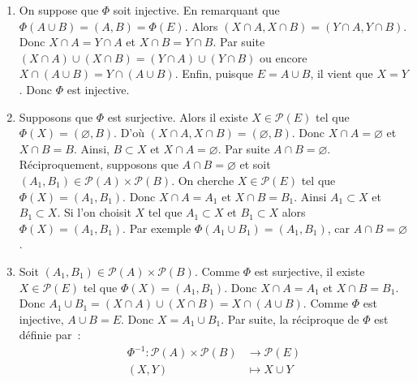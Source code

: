 	\begin{enumerate}
		\item On suppose que $\Phi$ soit injective. En remarquant que $\Phi(A \cup B) =(A,B)=\Phi(E)$. Alors $(X\cap A, X \cap B) = (Y \cap A, Y \cap B).$ Donc $X \cap A = Y \cap A$ et $X \cap B = Y \cap B$. Par suite $(X \cap A) \cup (X \cap B) = (Y \cap A) \cup (Y \cap B)$ ou encore $X\cap (A \cup B) = Y \cap(A \cup B)$. Enfin, puisque $E=A \cup B$, il  vient que $X=Y$. Donc $\Phi$ est injective.
		\item Supposons que $\Phi$ est surjective. Alors il existe $X \in \mathcal{P}(E)$ tel que $\Phi(X)=(\varnothing, B)$. D'où $(X \cap A, X \cap B)=(\varnothing, B)$. Donc $X \cap A = \varnothing$ et $X\cap B = B$. Ainsi, $B \subset X$ et $X \cap A = \varnothing$. Par suite $A\cap B = \varnothing$. Réciproquement, supposons que $A\cap B=\varnothing$ et soit $(A_1, B_1)\in \mathcal{P}(A)\times \mathcal{P}(B)$. On cherche $X\in \mathcal{P}(E)$ tel que $\Phi (X)=(A_1,B_1)$. Donc $X\cap A =A_1$ et $X\cap B = B_1$. Ainsi $A_1 \subset X$ et $B_1 \subset X$. Si l'on choisit $X$ tel que $A_1 \subset X$  et $B_1 \subset X$ alors $\Phi (X)=(A_1,B_1)$. Par exemple $\Phi (A_1\cup B_1)=(A_1,B_1)$, car $A\cap B=\varnothing$.
		\item Soit $(A_1, B_1)\in \mathcal{P}(A)\times \mathcal{P}(B)$. Comme $\Phi$ est surjective, il existe $X\in \mathcal{P}(E)$ tel que $\Phi (X)=(A_1,B_1)$. Donc $X\cap A =A_1$ et $X\cap B = B_1$. Donc $A_1 \cup B_1 =(X\cap A)\cup (X\cap B) = X\cap (A\cup B)$. Comme $\Phi$ est injective, $A\cup B=E$. Donc $X=A_1\cup B_1$. Par suite, la réciproque de $\Phi$ est définie par :
		\begin{align*}
			\Phi^{-1}: \mathcal{P}(A)\times \mathcal{P}(B) &\longrightarrow \mathcal{P}(E)\\
			(X,Y) &\longmapsto X\cup Y
		\end{align*}
	\end{enumerate}

